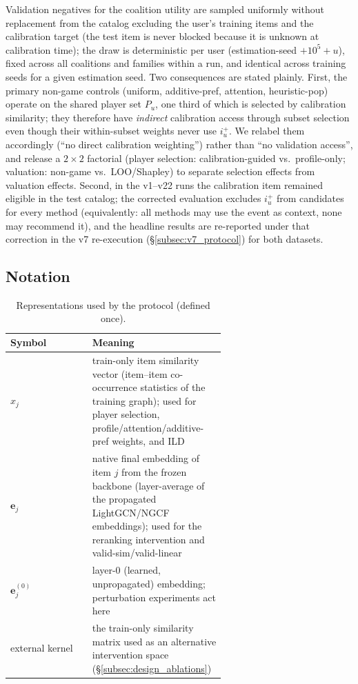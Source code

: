 \documentclass[pdflatex,sn-mathphys-num]{sn-jnl}
\begin{document}
Validation negatives for the coalition utility are sampled uniformly without replacement from the catalog excluding the user's training items and the calibration target (the test item is never blocked because it is unknown at calibration time); the draw is deterministic per user (estimation-seed $+10^{5}+u$), fixed across all coalitions and families within a run, and identical across training seeds for a given estimation seed. Two consequences are stated plainly. First, the primary non-game controls (uniform, additive-pref, attention, heuristic-pop) operate on the shared player set $P_u$, one third of which is selected by calibration similarity; they therefore have \emph{indirect} calibration access through subset selection even though their within-subset weights never use $i_u^+$. We relabel them accordingly (``no direct calibration weighting'') rather than ``no validation access'', and release a $2\times2$ factorial (player selection: calibration-guided vs.\ profile-only; valuation: non-game vs.\ LOO/Shapley) to separate selection effects from valuation effects. Second, in the v1--v22 runs the calibration item remained eligible in the test catalog; the corrected evaluation excludes $i_u^+$ from candidates for every method (equivalently: all methods may use the event as context, none may recommend it), and the headline results are re-reported under that correction in the v7 re-execution (\S\ref{subsec:v7_protocol}) for both datasets.

\subsection{Notation}\label{subsec:notation}

\begin{table}[t]
\caption{Representations used by the protocol (defined once).}\label{tab:notation}
\centering
\small
\begin{tabular}{lp{0.62\linewidth}}
\toprule
Symbol & Meaning \\
\midrule
$x_j$ & train-only item similarity vector (item--item co-occurrence statistics of the training graph); used for player selection, profile/attention/additive-pref weights, and ILD \\
$\mathbf{e}_j$ & native final embedding of item $j$ from the frozen backbone (layer-average of the propagated LightGCN/NGCF embeddings); used for the reranking intervention and valid-sim/valid-linear \\
$\mathbf{e}^{(0)}_j$ & layer-0 (learned, unpropagated) embedding; perturbation experiments act here \\
external kernel & the train-only similarity matrix used as an alternative intervention space (\S\ref{subsec:design_ablations}) \\
\bottomrule
\end{tabular}
\end{table}
\end{document}
